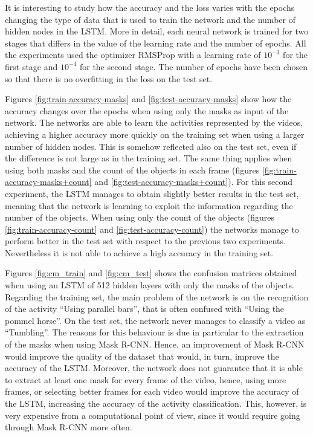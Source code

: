 \documentclass[12pt]{article}
\numberwithin{equation}{section} %
\numberwithin{figure}{section} %
\numberwithin{table}{section} %
\theoremstyle{definition}
\begin{document}
It is interesting to study how the accuracy and the loss varies
with the epochs changing the type of data that is used to
train the network and the number of hidden nodes in the 
LSTM. More in detail, each neural network is trained
for two stages that differs in the value of the learning
rate and the number of epochs. All the experiments used
the optimizer RMSProp with
a learning rate of $10^{-3}$ for the first stage and $10^{-4}$
for the second stage. The number of epochs have been chosen
so that there is no overfitting in the loss on the test set.

Figures \ref{fig:train-accuracy-masks} and
\ref{fig:test-accuracy-masks} show how the accuracy changes 
over the epochs when using only the masks as input of the
network. The networks are able to learn the activities
represented by the videos, achieving a higher accuracy
more quickly on the training set when using a larger number of
hidden nodes. This is somehow reflected also on the test
set, even if the difference is not large as in the training
set. The same thing
applies when using both masks and the count of the objects
in each frame (figures \ref{fig:train-accuracy-masks+count} and
\ref{fig:test-accuracy-masks+count}).
For this second experiment, the LSTM manages
to obtain slightly better results in the test set, meaning
that the network is learning to exploit the information
regarding the number of the objects.
When using only the count of the objects (figures
\ref{fig:train-accuracy-count} and
\ref{fig:test-accuracy-count}) the networks manage to perform
better in the test set with respect to the previous two
experiments. Nevertheless it is not able to achieve a high
accuracy in the training set.

Figures \ref{fig:cm_train} and \ref{fig:cm_test} shows 
the confusion matrices obtained when using an LSTM of 512
hidden layers with only the masks of the objects.
Regarding the training set, the main problem of the network
is on the recognition of the activity ``Using parallel
bars'', that is often confused with ``Using the pommel
horse''. On the test set, the network never manages to
classify a video as ``Tumbling''. The reasons for this
behaviour is due in particular to the extraction of the
masks when using Mask R-CNN. Hence, an improvement of
Mask R-CNN would improve the quality of the dataset that would,
in turn, improve the accuracy of the LSTM. Moreover, the
network does not guarantee that it is able to extract
at least one mask for every frame of the video, hence, using
more frames, or selecting better frames for each video would
improve the accuracy of the LSTM, increasing the accuracy of
the activity classification.
This, however, is very expensive from a
computational point of view, since it would require going
through Mask R-CNN more often.
\end{document}

